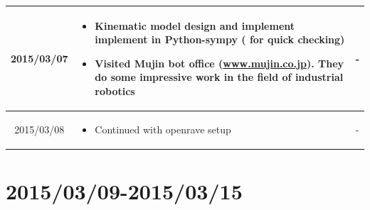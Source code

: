 \documentclass[11pt]{article} %
\begin{document}
\begin{center}
\begin{longtable}{ | c | p{6cm} | p{5cm} |}
	 2015/03/07         & 
  \begin{itemize}
  \item Kinematic model design and implement implement in Python-sympy ( for quick checking)
  \item Visited Mujin bot office (\url{www.mujin.co.jp}). They do some impressive work in the field of industrial robotics
\end{itemize}   
  & 
-  					\\					 \hline  	

2015/03/08         & 
  \begin{itemize}
  \item Continued with openrave setup
\end{itemize}   
  & 
-  					\\					 \hline  										 
  										   										 
    \end{longtable}
\end{center}

\newpage
\section{2015/03/09-2015/03/15}
\end{document}
